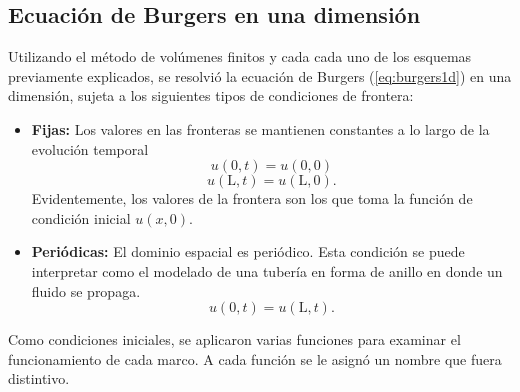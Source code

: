 \documentclass[12pt]{article}
\begin{document}
	\subsection{Ecuación de Burgers en una dimensión}
	Utilizando el método de volúmenes finitos y cada cada uno de los esquemas previamente explicados, se resolvió la ecuación de Burgers (\ref{eq:burgers1d}) en una dimensión, sujeta a los siguientes tipos de condiciones de frontera:
	\begin{itemize}
		\item \textbf{Fijas:} Los valores en las fronteras se mantienen constantes a lo largo de la evolución temporal
		\begin{equation}
			u(0,t) = u(0,0)
		\end{equation}
		\begin{equation}
			u(\text{L}, t) = u(\text{L}, 0).
		\end{equation}
		Evidentemente, los valores de la frontera son los que toma la función de condición inicial $u(x,0)$.
		\item \textbf{Periódicas:} El dominio espacial es periódico. Esta condición se puede interpretar como el modelado de una tubería en forma de anillo en donde un fluido se propaga.
		\begin{equation}
			u(0,t) = u(\text{L}, t).
		\end{equation}
	\end{itemize}
	Como condiciones iniciales, se aplicaron varias funciones para examinar el funcionamiento de cada marco. A cada función se le asignó un nombre que fuera distintivo.
\end{document}
